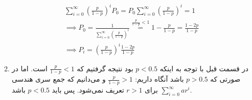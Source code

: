 \begin{enumerate}
    \begin{gather*}
        \sum_{i = 0}^{\infty} (\frac{p}{1 - p})^{i} P_0 =  P_0 \sum_{i = 0}^{\infty} (\frac{p}{1 - p})^{i} = 1\\
        \implies P_0 = \frac{1}{\sum_{i = 0}^{\infty} (\frac{p}{1 - p})^{i}} \stackrel{\frac{p}{1 - p} < 1}{=} 1 - \frac{p}{1 - p} = \frac{1 - 2p}{1 - p}\\
        \implies P_i =  (\frac{p}{1 - p})^{i} \frac{1 - 2p}{1 - p} 
    \end{gather*}
    \item در قسمت قبل با توجه به اینکه
    $p < 0.5$ بود نتیجه گرفتیم که
    $\frac{p}{1 - p} < 1$
    است. اما در صورتی که
    $p > 0.5$
    باشد آنگاه داریم:
    $\frac{p}{1 - p} > 1$
    و می‌دانیم که جمع سری هندسی
    $\sum_{i=0}^{\infty} ar^i$
    برای
    $r > 1$
    تعریف نمی‌شود. پس باید
    $p < 0.5$ 
    باشد.
\end{enumerate}